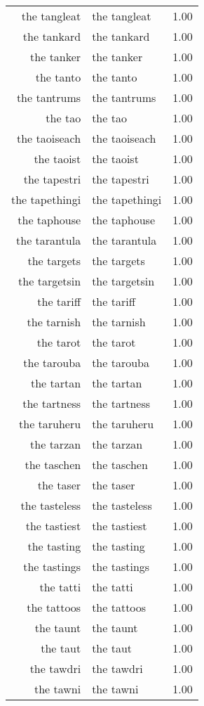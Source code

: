 \begin{table}[ht]
\begin{tabular}{rlr}
  the tangleat & the tangleat & 1.00 \\ 
  the tankard & the tankard & 1.00 \\ 
  the tanker & the tanker & 1.00 \\ 
  the tanto & the tanto & 1.00 \\ 
  the tantrums & the tantrums & 1.00 \\ 
  the tao & the tao & 1.00 \\ 
  the taoiseach & the taoiseach & 1.00 \\ 
  the taoist & the taoist & 1.00 \\ 
  the tapestri & the tapestri & 1.00 \\ 
  the tapethingi & the tapethingi & 1.00 \\ 
  the taphouse & the taphouse & 1.00 \\ 
  the tarantula & the tarantula & 1.00 \\ 
  the targets & the targets & 1.00 \\ 
  the targetsin & the targetsin & 1.00 \\ 
  the tariff & the tariff & 1.00 \\ 
  the tarnish & the tarnish & 1.00 \\ 
  the tarot & the tarot & 1.00 \\ 
  the tarouba & the tarouba & 1.00 \\ 
  the tartan & the tartan & 1.00 \\ 
  the tartness & the tartness & 1.00 \\ 
  the taruheru & the taruheru & 1.00 \\ 
  the tarzan & the tarzan & 1.00 \\ 
  the taschen & the taschen & 1.00 \\ 
  the taser & the taser & 1.00 \\ 
  the tasteless & the tasteless & 1.00 \\ 
  the tastiest & the tastiest & 1.00 \\ 
  the tasting & the tasting & 1.00 \\ 
  the tastings & the tastings & 1.00 \\ 
  the tatti & the tatti & 1.00 \\ 
  the tattoos & the tattoos & 1.00 \\ 
  the taunt & the taunt & 1.00 \\ 
  the taut & the taut & 1.00 \\ 
  the tawdri & the tawdri & 1.00 \\ 
  the tawni & the tawni & 1.00 \\ 

\end{tabular}
\end{table}

